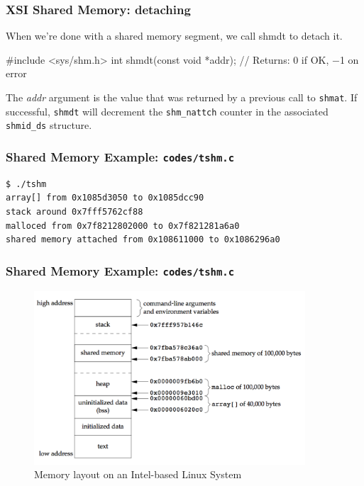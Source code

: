 \documentclass[newPxFont,sthlmFooter,nooffset]{beamer}
\begin{document}
\begin{frame}[t, fragile]
  \frametitle{XSI Shared Memory: detaching}
When we’re done with a shared memory segment, we call shmdt to detach it.
\begin{codedef}
#include <sys/shm.h>
int shmdt(const void *addr);
// Returns: 0 if OK, −1 on error
\end{codedef}
The \textit{addr} argument is the value that was returned by a previous call to \texttt{shmat}. If successful, \texttt{shmdt} will decrement the \texttt{shm\_nattch} counter in the associated \texttt{shmid\_ds} structure.
\end{frame}



\begin{frame}
  \frametitle{Shared Memory Example: \texttt{codes/tshm.c}}
  
\begin{verbatim}
$ ./tshm
array[] from 0x1085d3050 to 0x1085dcc90
stack around 0x7fff5762cf88
malloced from 0x7f8212802000 to 0x7f821281a6a0
shared memory attached from 0x108611000 to 0x1086296a0
\end{verbatim}
\end{frame}



\begin{frame}[t]
  \frametitle{Shared Memory Example: \texttt{codes/tshm.c}}
  \begin{figure}[h]
    \centering
    \includegraphics[width=0.9\textwidth]{figures/fig15_32-memory.png}
    \caption{Memory layout on an Intel-based Linux System}
  \end{figure}
\end{frame}
\end{document}
